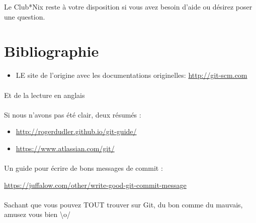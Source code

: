 \documentclass[french, a4paper, 12pt, titlepage]{article}
\begin{document}
Le Club*Nix reste à votre disposition si vous avez besoin d'aide ou désirez poser une question.

\section*{Bibliographie}

\begin{itemize}
	\item LE site de l'origine avec les documentations originelles: \url{http://git-scm.com}
\end{itemize}

\paragraph{}Et de la lecture en anglais
\paragraph{}
Si nous n'avons pas été clair, deux résumés :
\begin{itemize}
	\item \url{http://rogerdudler.github.io/git-guide/}
	\item \url{https://www.atlassian.com/git/}
\end{itemize}


\paragraph{}
Un guide pour écrire de bons messages de commit :

\url{https://juffalow.com/other/write-good-git-commit-message}



\paragraph{}Sachant que vous pouvez TOUT trouver sur Git, du bon comme du mauvais, amusez vous bien \textbackslash o/

\end{document}
